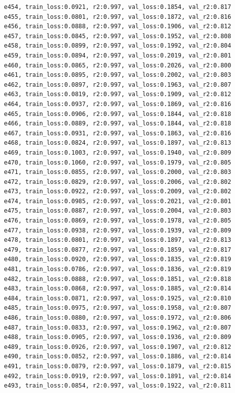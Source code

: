 \documentclass[a4paper, 12pt]{article}
\begin{document}
\begin{lstlisting}
e454, train_loss:0.0921, r2:0.997, val_loss:0.1854, val_r2:0.817
e455, train_loss:0.0801, r2:0.997, val_loss:0.1872, val_r2:0.816
e456, train_loss:0.0888, r2:0.997, val_loss:0.1906, val_r2:0.812
e457, train_loss:0.0845, r2:0.997, val_loss:0.1952, val_r2:0.808
e458, train_loss:0.0899, r2:0.997, val_loss:0.1992, val_r2:0.804
e459, train_loss:0.0894, r2:0.997, val_loss:0.2019, val_r2:0.801
e460, train_loss:0.0865, r2:0.997, val_loss:0.2026, val_r2:0.800
e461, train_loss:0.0895, r2:0.997, val_loss:0.2002, val_r2:0.803
e462, train_loss:0.0897, r2:0.997, val_loss:0.1963, val_r2:0.807
e463, train_loss:0.0819, r2:0.997, val_loss:0.1909, val_r2:0.812
e464, train_loss:0.0937, r2:0.997, val_loss:0.1869, val_r2:0.816
e465, train_loss:0.0906, r2:0.997, val_loss:0.1844, val_r2:0.818
e466, train_loss:0.0889, r2:0.997, val_loss:0.1844, val_r2:0.818
e467, train_loss:0.0931, r2:0.997, val_loss:0.1863, val_r2:0.816
e468, train_loss:0.0824, r2:0.997, val_loss:0.1897, val_r2:0.813
e469, train_loss:0.1003, r2:0.997, val_loss:0.1940, val_r2:0.809
e470, train_loss:0.1060, r2:0.997, val_loss:0.1979, val_r2:0.805
e471, train_loss:0.0855, r2:0.997, val_loss:0.2000, val_r2:0.803
e472, train_loss:0.0829, r2:0.997, val_loss:0.2006, val_r2:0.802
e473, train_loss:0.0922, r2:0.997, val_loss:0.2009, val_r2:0.802
e474, train_loss:0.0985, r2:0.997, val_loss:0.2021, val_r2:0.801
e475, train_loss:0.0887, r2:0.997, val_loss:0.2004, val_r2:0.803
e476, train_loss:0.0869, r2:0.997, val_loss:0.1978, val_r2:0.805
e477, train_loss:0.0938, r2:0.997, val_loss:0.1939, val_r2:0.809
e478, train_loss:0.0801, r2:0.997, val_loss:0.1897, val_r2:0.813
e479, train_loss:0.0877, r2:0.997, val_loss:0.1859, val_r2:0.817
e480, train_loss:0.0920, r2:0.997, val_loss:0.1835, val_r2:0.819
e481, train_loss:0.0786, r2:0.997, val_loss:0.1836, val_r2:0.819
e482, train_loss:0.0888, r2:0.997, val_loss:0.1851, val_r2:0.818
e483, train_loss:0.0868, r2:0.997, val_loss:0.1885, val_r2:0.814
e484, train_loss:0.0871, r2:0.997, val_loss:0.1925, val_r2:0.810
e485, train_loss:0.0975, r2:0.997, val_loss:0.1958, val_r2:0.807
e486, train_loss:0.0880, r2:0.997, val_loss:0.1972, val_r2:0.806
e487, train_loss:0.0833, r2:0.997, val_loss:0.1962, val_r2:0.807
e488, train_loss:0.0905, r2:0.997, val_loss:0.1936, val_r2:0.809
e489, train_loss:0.0926, r2:0.997, val_loss:0.1907, val_r2:0.812
e490, train_loss:0.0852, r2:0.997, val_loss:0.1886, val_r2:0.814
e491, train_loss:0.0879, r2:0.997, val_loss:0.1879, val_r2:0.815
e492, train_loss:0.0919, r2:0.997, val_loss:0.1891, val_r2:0.814
e493, train_loss:0.0854, r2:0.997, val_loss:0.1922, val_r2:0.811

\end{lstlisting}
\end{document}
